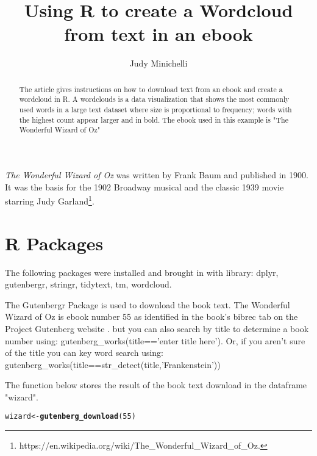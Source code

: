 \documentclass{article}\usepackage[]{graphicx}\usepackage[]{color}
\makeatletter
\newcommand{\hlnum}[1]{\textcolor[rgb]{0.686,0.059,0.569}{#1}}%
\newcommand{\hlstd}[1]{\textcolor[rgb]{0.345,0.345,0.345}{#1}}%
\newcommand{\hlkwb}[1]{\textcolor[rgb]{0.69,0.353,0.396}{#1}}%
\newcommand{\hlkwd}[1]{\textcolor[rgb]{0.737,0.353,0.396}{\textbf{#1}}}%
\newenvironment{kframe}{%
 \def\at@end@of@kframe{}%
 \ifinner\ifhmode%
  \def\at@end@of@kframe{\end{minipage}}%
  \begin{minipage}{\columnwidth}%
 \fi\fi%
 \def\FrameCommand##1{\hskip\@totalleftmargin \hskip-\fboxsep
 \colorbox{shadecolor}{##1}\hskip-\fboxsep
     \hskip-\linewidth \hskip-\@totalleftmargin \hskip\columnwidth}%
 \MakeFramed {\advance\hsize-\width
   \@totalleftmargin\z@ \linewidth\hsize
   \@setminipage}}%
 {\par\unskip\endMakeFramed%
 \at@end@of@kframe}
\newenvironment{knitrout}{}{} %
\makeatother
\begin{document}
\title{Using R to create a Wordcloud from text in an ebook}
\author{Judy Minichelli}
\maketitle

\begin{abstract}
The article gives instructions on how to download text from an ebook and create a 
wordcloud in R.  A wordclouds is a data visualization that shows the most commonly used words in a large text dataset where size is proportional to frequency; words with the highest count appear larger and in bold.  The ebook used in this example
is "The Wonderful Wizard of Oz"

\end{abstract}

\textit{The Wonderful Wizard of Oz} was written by Frank Baum and published in 1900. It was the basis for the 1902 Broadway musical and the classic 1939 movie starring Judy Garland\footnote{https://en.wikipedia.org/wiki/The_Wonderful_Wizard_of_Oz.}. 

\section{R Packages}

The following packages were installed and brought in with library: dplyr, gutenbergr, stringr, tidytext, tm, wordcloud.

The Gutenbergr Package is used to download the book text.  The Wonderful Wizard of Oz is ebook number 55 as identified in the book's bibrec tab on the Project Gutenberg website \citep{Silge}. but you can also search by title to determine a book number using: gutenberg_works(title=='enter title here').  Or, if you aren't sure of the title you can key word search using:  gutenberg_works(title==str_detect(title,'Frankenstein'))    

The function below stores the result of the book text download in the dataframe "wizard". 

\begin{knitrout}
\color{fgcolor}\begin{kframe}
\begin{alltt}
\hlstd{wizard}\hlkwb{<-}\hlkwd{gutenberg_download}\hlstd{(}\hlnum{55}\hlstd{)}
\end{alltt}


{\ttfamily\noindent\bfseries{}}\end{kframe}
\end{knitrout}
\end{document}
